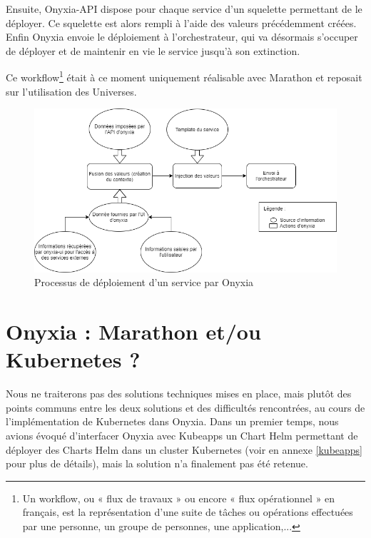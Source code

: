 \documentclass[11pt,fleqn]{book} %
\begin{document}
Ensuite, Onyxia-API dispose pour chaque service d'un squelette permettant de le déployer. Ce squelette est alors rempli à l'aide des valeurs précédemment créées.\\

Enfin Onyxia envoie le déploiement à l'orchestrateur, qui va désormais s'occuper de déployer et de maintenir en vie le service jusqu'à son extinction.

Ce workflow\footnote{Un workflow, ou « flux de travaux » ou encore « flux opérationnel » en français, est la représentation d'une suite de tâches ou opérations effectuées par une personne, un groupe de personnes, une application,... } était à ce moment uniquement réalisable avec Marathon et reposait sur l'utilisation des Universes.\\




\begin{figure}[H]
\renewcommand{\figurename}{Diagramme}
\hspace{-1cm}
\includegraphics[scale=0.7]{Pictures/onyxia/onyxia-simplifie.png}
\captionsetup{margin=1.5cm,format=hang,justification=justified}
\caption[]{Processus de déploiement d'un service par Onyxia \newline}
\end{figure}



\section{Onyxia : Marathon et/ou Kubernetes ?}
Nous ne traiterons pas des solutions techniques mises en place, mais plutôt des points communs entre les deux solutions et des difficultés rencontrées, au cours de l'implémentation de Kubernetes dans Onyxia. Dans un premier temps, nous avions évoqué d'interfacer Onyxia avec Kubeapps un Chart Helm permettant de déployer des Charts Helm dans un cluster Kubernetes (voir en annexe \ref{kubeapps} pour plus de détails), mais la solution n'a finalement pas été retenue.\newline
\end{document}
